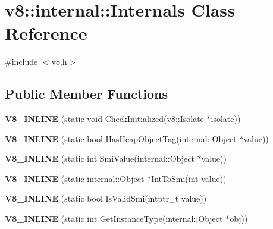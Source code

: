 \hypertarget{classv8_1_1internal_1_1_internals}{}\section{v8\+:\+:internal\+:\+:Internals Class Reference}
\label{classv8_1_1internal_1_1_internals}


{\ttfamily \#include $<$v8.\+h$>$}

\subsection*{Public Member Functions}
\begin{DoxyCompactItemize}
\item 
\hypertarget{classv8_1_1internal_1_1_internals_a060c3d6f951d0ea5f19f29c0c371e337}{}{\bfseries V8\+\_\+\+I\+N\+L\+I\+N\+E} (static void Check\+Initialized(\hyperlink{classv8_1_1_isolate}{v8\+::\+Isolate} $\ast$isolate))\label{classv8_1_1internal_1_1_internals_a060c3d6f951d0ea5f19f29c0c371e337}

\item 
\hypertarget{classv8_1_1internal_1_1_internals_a52f44fc3c5e19b1caa2acaa066f32632}{}{\bfseries V8\+\_\+\+I\+N\+L\+I\+N\+E} (static bool Has\+Heap\+Object\+Tag(internal\+::\+Object $\ast$value))\label{classv8_1_1internal_1_1_internals_a52f44fc3c5e19b1caa2acaa066f32632}

\item 
\hypertarget{classv8_1_1internal_1_1_internals_a7d7e7480933a759c01abac08bd6381aa}{}{\bfseries V8\+\_\+\+I\+N\+L\+I\+N\+E} (static int Smi\+Value(internal\+::\+Object $\ast$value))\label{classv8_1_1internal_1_1_internals_a7d7e7480933a759c01abac08bd6381aa}

\item 
\hypertarget{classv8_1_1internal_1_1_internals_ad33ce42ab342b8fa92af7926c411571b}{}{\bfseries V8\+\_\+\+I\+N\+L\+I\+N\+E} (static internal\+::\+Object $\ast$Int\+To\+Smi(int value))\label{classv8_1_1internal_1_1_internals_ad33ce42ab342b8fa92af7926c411571b}

\item 
\hypertarget{classv8_1_1internal_1_1_internals_a131c65815ef4862db9958033e24d32fb}{}{\bfseries V8\+\_\+\+I\+N\+L\+I\+N\+E} (static bool Is\+Valid\+Smi(intptr\+\_\+t value))\label{classv8_1_1internal_1_1_internals_a131c65815ef4862db9958033e24d32fb}

\item 
\hypertarget{classv8_1_1internal_1_1_internals_a1114867607d59c883c27ac4f1a2d8f3a}{}{\bfseries V8\+\_\+\+I\+N\+L\+I\+N\+E} (static int Get\+Instance\+Type(internal\+::\+Object $\ast$obj))\label{classv8_1_1internal_1_1_internals_a1114867607d59c883c27ac4f1a2d8f3a}


\end{DoxyCompactItemize}
